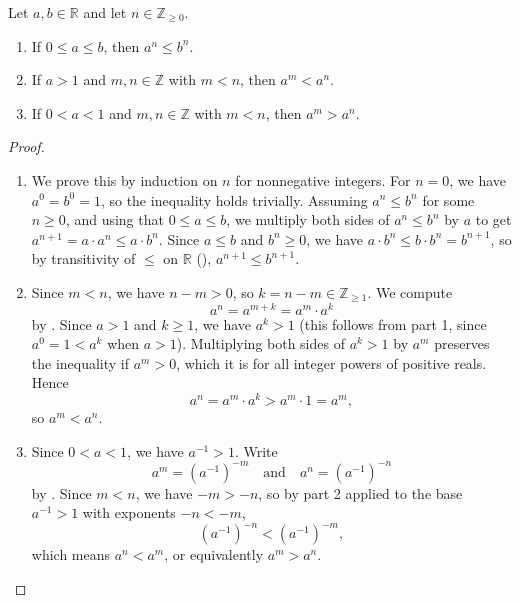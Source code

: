 \begin{lemma} \label{lemma:monotonicity_of_integer_powers_of_positive_reals}
    Let $a,b \in \mathbb{R}$ and let $n \in \mathbb{Z}_{\geq 0}$.

    \begin{enumerate}
        \item If $0 \leq a \leq b$, then $a^n \leq b^n$.
        \item If $a > 1$ and $m,n \in \mathbb{Z}$ with $m < n$, then $a^m < a^n$.
        \item If $0 < a < 1$ and $m,n \in \mathbb{Z}$ with $m < n$, then $a^m > a^n$.
    \end{enumerate}
\end{lemma}

\begin{proof}
\begin{enumerate}
    \item We prove this by induction on $n$ for nonnegative integers. For $n = 0$, we have $a^0 = b^0 = 1$, so the inequality holds trivially. Assuming $a^n \leq b^n$ for some $n \geq 0$, and using that $0 \leq a \leq b$, we multiply both sides of $a^n \leq b^n$ by $a$ to get $a^{n+1} = a \cdot a^n \leq a \cdot b^n$. Since $a \leq b$ and $b^n \geq 0$, we have $a \cdot b^n \leq b \cdot b^n = b^{n+1}$, so by transitivity of $\leq$ on $\mathbb{R}$ (), $a^{n+1} \leq b^{n+1}$.

    \item Since $m < n$, we have $n - m > 0$, so $k = n - m \in \mathbb{Z}_{\geq 1}$. We compute
    $$a^n = a^{m+k} = a^m \cdot a^k$$
    by . Since $a > 1$ and $k \geq 1$, we have $a^k > 1$ (this follows from part 1, since $a^0 = 1 < a^k$ when $a > 1$). Multiplying both sides of $a^k > 1$ by $a^m$ preserves the inequality if $a^m > 0$, which it is for all integer powers of positive reals. Hence
    $$a^n = a^m \cdot a^k > a^m \cdot 1 = a^m,$$
    so $a^m < a^n$.

    \item Since $0 < a < 1$, we have $a^{-1} > 1$. Write
    $$a^m = (a^{-1})^{-m} \quad\text{and}\quad a^n = (a^{-1})^{-n}$$
    by . Since $m < n$, we have $-m > -n$, so by part 2 applied to the base $a^{-1} > 1$ with exponents $-n < -m$,
    $$\left(a^{-1}\right)^{-n} < \left(a^{-1}\right)^{-m},$$
    which means $a^n < a^m$, or equivalently $a^m > a^n$.
\end{enumerate}
\end{proof}
